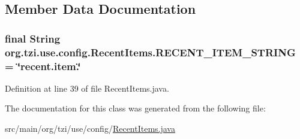 \subsection{Member Data Documentation}
\hypertarget{classorg_1_1tzi_1_1use_1_1config_1_1_recent_items_a64ed17aa1673d17fe1260ba97df6e8b9}{
\subsubsection[{R\-E\-C\-E\-N\-T\-\_\-\-I\-T\-E\-M\-\_\-\-S\-T\-R\-I\-N\-G}]{\setlength{\rightskip}{0pt plus 5cm}final String org.\-tzi.\-use.\-config.\-Recent\-Items.\-R\-E\-C\-E\-N\-T\-\_\-\-I\-T\-E\-M\-\_\-\-S\-T\-R\-I\-N\-G = \char`\"{}recent.\-item.\char`\"{}\hspace{0.3cm}{\ttfamily [static]}}}\label{classorg_1_1tzi_1_1use_1_1config_1_1_recent_items_a64ed17aa1673d17fe1260ba97df6e8b9}


Definition at line 39 of file Recent\-Items.\-java.



The documentation for this class was generated from the following file\-:\begin{DoxyCompactItemize}
\item 
src/main/org/tzi/use/config/\hyperlink{_recent_items_8java}{Recent\-Items.\-java}\end{DoxyCompactItemize}
